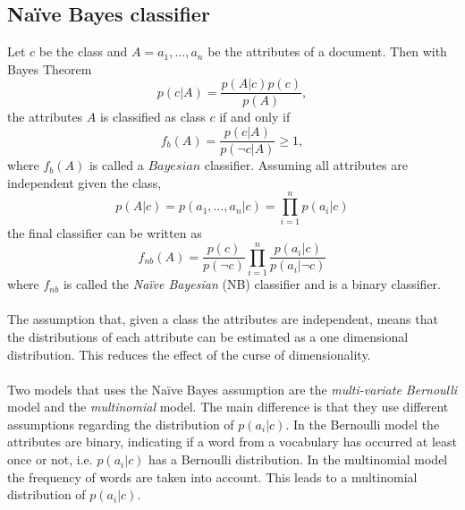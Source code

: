 \subsection{Naïve Bayes classifier}
Let $c$ be the class and $A = a_1, \dots ,a_n$ be the attributes of a document. Then with Bayes Theorem
\begin{equation}
p(c|A)=\frac{p(A|c)p(c)}{p(A)},
\end{equation}
the attributes $A$ is classified as class $c$ if and only if
\begin{equation}
f_b(A)=\frac{p(c|A)}{p(\neg c|A)} \geq 1,
\end{equation}
where $f_b(A)$ is called a $Bayesian$ classifier. Assuming all attributes are independent given the class, 
\[
p(A|c)=p(a_1,\dots ,a_n | c) = \prod_{i=1}^n p(a_i|c)
\]
the final classifier can be written as
\begin{equation}
f_{nb}(A) = \frac{p(c)}{p(\neg c)}\prod_{i=1}^n\frac{p(a_i|c)}{p(a_i|\neg c)}
\end{equation}
where $f_{nb}$ is called the \emph{Naïve Bayesian} (NB) classifier and is a binary classifier.\\\\
The assumption that, given a class the attributes are independent, means that the distributions of each attribute can be estimated as a one dimensional distribution. This reduces the effect of the curse of dimensionality. \cite{Zhang04optimality}\\\\
Two models that uses the Naïve Bayes assumption are the \emph{multi-variate Bernoulli} model and the \emph{multinomial} model. The main difference is that they use different assumptions regarding the distribution of $p(a_i|c)$. In the Bernoulli model the attributes are binary, indicating if a word from a vocabulary has occurred at least once or not, i.e. $p(a_i|c)$ has a Bernoulli distribution. In the multinomial model the frequency of words are taken into account. This leads to a multinomial distribution of $p(a_i|c)$. \cite{McCallum98acomparison}\cite{bernoulliDistr}\cite{multinomialDistr}